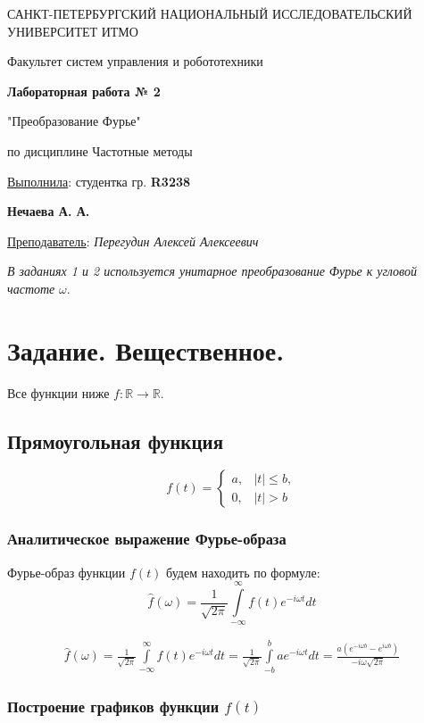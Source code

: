 \documentclass[a5paper, 10pt]{article}
\theoremstyle{definition}
\theoremstyle{plain}
\theoremstyle{remark}
\newcommand*{\titlePage}{
	\thispagestyle{title}
	\begingroup
	\begin{center}
		\vspace*{6ex}
		
		{\small
			САНКТ-ПЕТЕРБУРГСКИЙ НАЦИОНАЛЬНЫЙ ИССЛЕДОВАТЕЛЬСКИЙ УНИВЕРСИТЕТ ИТМО	
		}
		
		\vspace*{2ex}
		
		{\normalsize
			Факультет систем управления и робототехники
		}
		
		\vspace*{15ex}
		
		{\Large \bfseries 
			Лабораторная работа № 2
		}
\vspace*{2ex}
	{\Large \bfseries 
			
"Преобразование Фурье"
		}
\vspace*{2ex}
		
		{\normalsize
			по дисциплине Частотные методы
		}

	\end{center}
	\vspace*{20ex}
	\begin{flushright}
		{\large 
			\underline{Выполнила}: студентка гр. \textbf{R3238}\\
			\begin{flushright}
				\textbf{Нечаева А. А.}\\
			\end{flushright}
		}
		
		\vspace*{5ex}
		
		{\large 
			\underline{Преподаватель}: \textit{Перегудин Алексей Алексеевич}
		}
	\end{flushright}	
	\newpage
	\setcounter{page}{1}
	\endgroup}
\begin{document}
	\titlePage
	\pagestyle{style}
\newpage
\textit{В заданиях 1 и 2 используется унитарное преобразование Фурье к угловой частоте} $\omega$.




\section{Задание. Вещественное.}
Все функции ниже $f : \mathbb{R} \to \mathbb{R}$.

\subsection{Прямоугольная функция}

\begin{equation}
f(t) =
\begin{cases}
a, & |t| \leq b,\\
0, & |t| > b
\end{cases}
\end{equation}


\subsubsection{Аналитическое выражение Фурье-образа}

Фурье-образ функции $f(t)$ будем находить по формуле:
\begin{equation}
\hat{f}(\omega) = \frac{1}{\sqrt{2 \pi}} \int \limits_{-\infty}^{\infty} f(t) e^{-i \omega t} dt
\end{equation}



\begin{multline}
\hat{f}(\omega) = \frac{1}{\sqrt{2 \pi}} \int \limits_{-\infty}^{\infty} f(t) e^{-i \omega t} dt = \frac{1}{\sqrt{2 \pi}} \int \limits_{-b}^{b} a e^{-i \omega t} dt =   \frac{a ( e^{-i \omega b} -  e^{i \omega b})}{-i\omega \sqrt{2 \pi}}
\end{multline}

\newpage
\subsubsection{Построение графиков функции $f(t)$}
\end{document}
